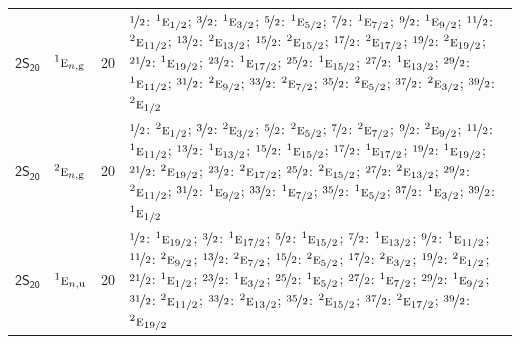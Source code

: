 \documentclass[10pt,a4paper]{article}
\numberwithin{equation}{section}
\newcommand{\grp}[1]{\mathsf{#1}}
\newcommand{\irr}[1]{\text{\normalfont\scshape #1}}
\newcommand{\conjpair}[1]{{}^{#1}}
\newcommand{\ptag}[1]{\mathrm{#1}}
\newlength{\fillwidth}\newlength{\cellwidth}\newlength{\colwidth}
\begin{document}
{\begin{longtable}{@{}llr>{\RaggedRight\arraybackslash}p{\fillwidth}@{}}
\href{2S20.pdf}{$\grp{2S_{20}}$} & $\conjpair{1}\irr{e}_{n,\ptag{g}}$ & 20 & $\nicefrac{1}{2}$: $\conjpair{1}\irr{e}_{1/2}$; $\nicefrac{3}{2}$: $\conjpair{1}\irr{e}_{3/2}$; $\nicefrac{5}{2}$: $\conjpair{1}\irr{e}_{5/2}$; $\nicefrac{7}{2}$: $\conjpair{1}\irr{e}_{7/2}$; $\nicefrac{9}{2}$: $\conjpair{1}\irr{e}_{9/2}$; $\nicefrac{11}{2}$: $\conjpair{2}\irr{e}_{11/2}$; $\nicefrac{13}{2}$: $\conjpair{2}\irr{e}_{13/2}$; $\nicefrac{15}{2}$: $\conjpair{2}\irr{e}_{15/2}$; $\nicefrac{17}{2}$: $\conjpair{2}\irr{e}_{17/2}$; $\nicefrac{19}{2}$: $\conjpair{2}\irr{e}_{19/2}$; $\nicefrac{21}{2}$: $\conjpair{1}\irr{e}_{19/2}$; $\nicefrac{23}{2}$: $\conjpair{1}\irr{e}_{17/2}$; $\nicefrac{25}{2}$: $\conjpair{1}\irr{e}_{15/2}$; $\nicefrac{27}{2}$: $\conjpair{1}\irr{e}_{13/2}$; $\nicefrac{29}{2}$: $\conjpair{1}\irr{e}_{11/2}$; $\nicefrac{31}{2}$: $\conjpair{2}\irr{e}_{9/2}$; $\nicefrac{33}{2}$: $\conjpair{2}\irr{e}_{7/2}$; $\nicefrac{35}{2}$: $\conjpair{2}\irr{e}_{5/2}$; $\nicefrac{37}{2}$: $\conjpair{2}\irr{e}_{3/2}$; $\nicefrac{39}{2}$: $\conjpair{2}\irr{e}_{1/2}$\\
\href{2S20.pdf}{$\grp{2S_{20}}$} & $\conjpair{2}\irr{e}_{n,\ptag{g}}$ & 20 & $\nicefrac{1}{2}$: $\conjpair{2}\irr{e}_{1/2}$; $\nicefrac{3}{2}$: $\conjpair{2}\irr{e}_{3/2}$; $\nicefrac{5}{2}$: $\conjpair{2}\irr{e}_{5/2}$; $\nicefrac{7}{2}$: $\conjpair{2}\irr{e}_{7/2}$; $\nicefrac{9}{2}$: $\conjpair{2}\irr{e}_{9/2}$; $\nicefrac{11}{2}$: $\conjpair{1}\irr{e}_{11/2}$; $\nicefrac{13}{2}$: $\conjpair{1}\irr{e}_{13/2}$; $\nicefrac{15}{2}$: $\conjpair{1}\irr{e}_{15/2}$; $\nicefrac{17}{2}$: $\conjpair{1}\irr{e}_{17/2}$; $\nicefrac{19}{2}$: $\conjpair{1}\irr{e}_{19/2}$; $\nicefrac{21}{2}$: $\conjpair{2}\irr{e}_{19/2}$; $\nicefrac{23}{2}$: $\conjpair{2}\irr{e}_{17/2}$; $\nicefrac{25}{2}$: $\conjpair{2}\irr{e}_{15/2}$; $\nicefrac{27}{2}$: $\conjpair{2}\irr{e}_{13/2}$; $\nicefrac{29}{2}$: $\conjpair{2}\irr{e}_{11/2}$; $\nicefrac{31}{2}$: $\conjpair{1}\irr{e}_{9/2}$; $\nicefrac{33}{2}$: $\conjpair{1}\irr{e}_{7/2}$; $\nicefrac{35}{2}$: $\conjpair{1}\irr{e}_{5/2}$; $\nicefrac{37}{2}$: $\conjpair{1}\irr{e}_{3/2}$; $\nicefrac{39}{2}$: $\conjpair{1}\irr{e}_{1/2}$\\
\href{2S20.pdf}{$\grp{2S_{20}}$} & $\conjpair{1}\irr{e}_{n,\ptag{u}}$ & 20 & $\nicefrac{1}{2}$: $\conjpair{1}\irr{e}_{19/2}$; $\nicefrac{3}{2}$: $\conjpair{1}\irr{e}_{17/2}$; $\nicefrac{5}{2}$: $\conjpair{1}\irr{e}_{15/2}$; $\nicefrac{7}{2}$: $\conjpair{1}\irr{e}_{13/2}$; $\nicefrac{9}{2}$: $\conjpair{1}\irr{e}_{11/2}$; $\nicefrac{11}{2}$: $\conjpair{2}\irr{e}_{9/2}$; $\nicefrac{13}{2}$: $\conjpair{2}\irr{e}_{7/2}$; $\nicefrac{15}{2}$: $\conjpair{2}\irr{e}_{5/2}$; $\nicefrac{17}{2}$: $\conjpair{2}\irr{e}_{3/2}$; $\nicefrac{19}{2}$: $\conjpair{2}\irr{e}_{1/2}$; $\nicefrac{21}{2}$: $\conjpair{1}\irr{e}_{1/2}$; $\nicefrac{23}{2}$: $\conjpair{1}\irr{e}_{3/2}$; $\nicefrac{25}{2}$: $\conjpair{1}\irr{e}_{5/2}$; $\nicefrac{27}{2}$: $\conjpair{1}\irr{e}_{7/2}$; $\nicefrac{29}{2}$: $\conjpair{1}\irr{e}_{9/2}$; $\nicefrac{31}{2}$: $\conjpair{2}\irr{e}_{11/2}$; $\nicefrac{33}{2}$: $\conjpair{2}\irr{e}_{13/2}$; $\nicefrac{35}{2}$: $\conjpair{2}\irr{e}_{15/2}$; $\nicefrac{37}{2}$: $\conjpair{2}\irr{e}_{17/2}$; $\nicefrac{39}{2}$: $\conjpair{2}\irr{e}_{19/2}$\\

\end{longtable}}
\end{document}
